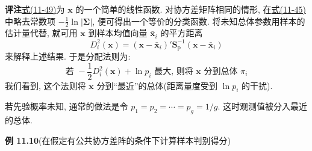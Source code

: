 
\noindent\textbf{评注}\quad \hyperref[eq:11-49]{式(11-49)}为 $\mathbf{x}$ 的一个简单的线性函数. 对协方差矩阵相同的情形, 在\hyperref[eq:11-45]{式(11-45)}中略去常数项 $-\frac{1}{2}\ln|\boldsymbol{\Sigma}|$, 便可得出一个等价的分类函数. 将未知总体参数用样本的估计量代替, 就可用 $\mathbf{x}$ 到样本均值向量 $\bar{\mathbf{x}}_i$ 的平方距离
\label{eq:11-53}
\begin{equation}
D_i^2(\mathbf{x})=(\mathbf{x}-\bar{\mathbf{x}}_i)'\mathbf{S}_{\mathrm{p}}^{-1}(\mathbf{x}-\bar{\mathbf{x}}_i)
\tag{11-53}
\end{equation}
来解释上述结果. 于是分配法则为:
\label{eq:11-54}
\begin{equation}
\text{若 }-\frac{1}{2}D_i^2(\mathbf{x})+\ln p_i\text{ 最大, 则将 }\mathbf{x}\text{ 分到总体 }\pi_i
\tag{11-54}
\end{equation}
我们看到, 这个法则将 $\mathbf{x}$ 分到“最近”的总体(距离量度受到 $\ln p_i$ 的干扰).

若先验概率未知, 通常的做法是令 $p_1=p_2=\cdots=p_g=1/g$. 这时观测值被分入最近的总体.

\noindent\textbf{例 11.10}\quad (在假定有公共协方差阵的条件下计算样本判别得分)

